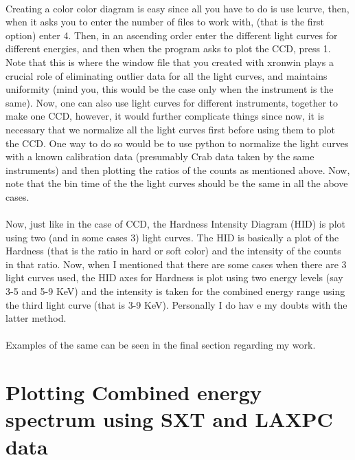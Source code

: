 \documentclass[a4paper,twoside]{report}
\numberwithin{equation}{section}
\begin{document}
\paragraph{}
Creating a color color diagram is easy since all you have to do is use lcurve, then, when it asks you to enter the number of files to work with, (that is the first option) enter 4. Then, in an ascending order enter the different light curves for different energies, and then when the program asks to plot the CCD, press 1. Note that this is where the window file that you created with xronwin plays a crucial role of eliminating outlier data for all the light curves, and maintains uniformity (mind you, this would be the case only when the instrument is the same). Now, one can also use light curves for different instruments, together to make one CCD, however, it would further complicate things since now, it is necessary that we normalize all the light curves first before using them to plot the CCD. One way to do so would be to use python to normalize the light curves with a known calibration data (presumably Crab data taken by the same instruments) and then plotting the ratios of the counts as mentioned above. Now, note that the bin time of the the light curves should be the same in all the above cases. 
\paragraph{}
Now, just like in the case of CCD, the Hardness Intensity Diagram (HID) is plot using two (and in some cases 3) light curves. The HID is basically a plot of the Hardness (that is the ratio in hard or soft color) and the intensity of the counts in that ratio. Now, when I mentioned that there are some cases when there are 3 light curves used, the HID axes for Hardness is plot using two energy levels (say 3-5 and 5-9 KeV) and the intensity is taken for the combined energy range using the third light curve (that is 3-9 KeV). Personally I do hav e my doubts with the latter method. 
\paragraph{}
Examples of the same can be seen in the final section regarding my work. 



\newpage
\clearpage
\section{Plotting Combined energy spectrum using SXT and LAXPC data}
\end{document}
